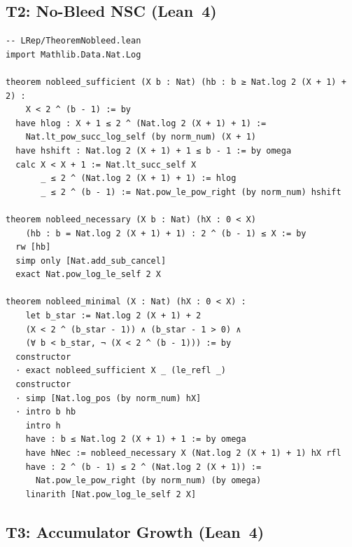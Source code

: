 \documentclass[11pt,a4paper]{article}
\theoremstyle{definition}
\theoremstyle{plain}
\theoremstyle{remark}
\begin{document}
\subsection{T2: No-Bleed NSC (Lean~4)}

\begin{leanblock}
\begin{lstlisting}[language={}]
-- LRep/TheoremNobleed.lean
import Mathlib.Data.Nat.Log

theorem nobleed_sufficient (X b : Nat) (hb : b ≥ Nat.log 2 (X + 1) + 2) :
    X < 2 ^ (b - 1) := by
  have hlog : X + 1 ≤ 2 ^ (Nat.log 2 (X + 1) + 1) :=
    Nat.lt_pow_succ_log_self (by norm_num) (X + 1)
  have hshift : Nat.log 2 (X + 1) + 1 ≤ b - 1 := by omega
  calc X < X + 1 := Nat.lt_succ_self X
       _ ≤ 2 ^ (Nat.log 2 (X + 1) + 1) := hlog
       _ ≤ 2 ^ (b - 1) := Nat.pow_le_pow_right (by norm_num) hshift

theorem nobleed_necessary (X b : Nat) (hX : 0 < X)
    (hb : b = Nat.log 2 (X + 1) + 1) : 2 ^ (b - 1) ≤ X := by
  rw [hb]
  simp only [Nat.add_sub_cancel]
  exact Nat.pow_log_le_self 2 X

theorem nobleed_minimal (X : Nat) (hX : 0 < X) :
    let b_star := Nat.log 2 (X + 1) + 2
    (X < 2 ^ (b_star - 1)) ∧ (b_star - 1 > 0) ∧
    (∀ b < b_star, ¬ (X < 2 ^ (b - 1))) := by
  constructor
  · exact nobleed_sufficient X _ (le_refl _)
  constructor
  · simp [Nat.log_pos (by norm_num) hX]
  · intro b hb
    intro h
    have : b ≤ Nat.log 2 (X + 1) + 1 := by omega
    have hNec := nobleed_necessary X (Nat.log 2 (X + 1) + 1) hX rfl
    have : 2 ^ (b - 1) ≤ 2 ^ (Nat.log 2 (X + 1)) :=
      Nat.pow_le_pow_right (by norm_num) (by omega)
    linarith [Nat.pow_log_le_self 2 X]
\end{lstlisting}
\end{leanblock}

\subsection{T3: Accumulator Growth (Lean~4)}
\end{document}
